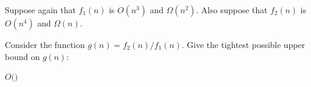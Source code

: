 \Needspace{1.25in}
\begin{prob}
    Suppose again that $f_1(n)$ is $O(n^3)$ and $\Omega(n^2)$. Also suppose that $f_2(n)$
    is $O(n^4)$ and $\Omega(n)$.

    Consider the function $g(n) = f_2(n) / f_1(n)$. Give the tightest possible upper bound on $g(n)$:

    $O($$)$
\end{prob}

